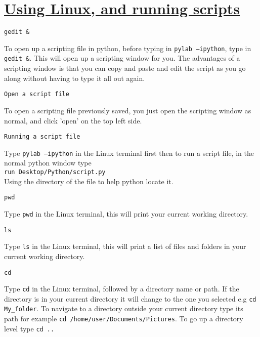 \section*{\underline{Using Linux, and running scripts}}
\noindent \texttt{gedit  \&}
\begin{myindentpar}{1.4cm}
\vspace*{-1ex}
To open up a scripting file in python, before typing in \texttt{pylab –ipython}, type in \texttt{gedit \&}. This will open up a scripting window for you. The advantages of a scripting window is that you can copy and paste and edit the script as you go along without having to type it all out again. 
\end{myindentpar}

\noindent \texttt{Open a script file}
\begin{myindentpar}{1.4cm}
\vspace*{-1ex}
To open a scripting file previously saved, you just open the scripting window as normal, and click 'open' on the top left side.
\end{myindentpar}

\noindent \texttt{Running a script file}
\begin{myindentpar}{1.4cm}
\vspace*{-1ex}
Type \texttt{pylab –ipython} in the Linux terminal first then to run a script file, in the normal python window type\\
\texttt{run Desktop/Python/script.py}\\
Using the directory of the file to help python locate it.
\end{myindentpar}

\noindent \texttt{pwd}
\begin{myindentpar}{1.4cm}
\vspace*{-1ex}
Type \texttt{pwd} in the Linux terminal, this will print your current working directory.
\end{myindentpar}

\noindent \texttt{ls}
\begin{myindentpar}{1.4cm}
\vspace*{-1ex}
Type \texttt{ls} in the Linux terminal, this will print a list of files and folders in your current working directory.
\end{myindentpar}

\noindent \texttt{cd}
\begin{myindentpar}{1.4cm}
\vspace*{-1ex}
Type \texttt{cd} in the Linux terminal, followed by a directory name or path. If the directory is in your current directory it will change to the one you selected e.g \texttt{cd My\_folder}. To navigate to a directory outside your current directory type its path for example \texttt{cd /home/user/Documents/Pictures}. To go up a directory level type \texttt{cd ..}
\end{myindentpar}

